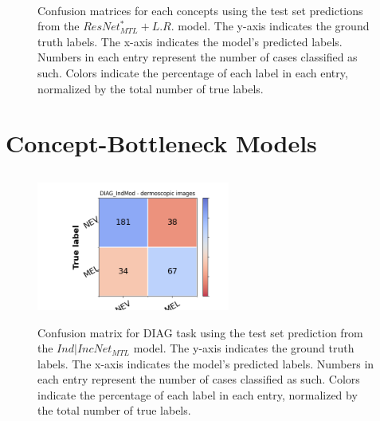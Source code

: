 \begin{figure}[ht]
\\
\caption{Confusion matrices for each concepts using the test set predictions
from the $ResNet^*_{MTL}+L.R.$ model. The y-axis indicates the ground truth labels. The x-axis indicates the model’s predicted labels. Numbers in each entry represent
the number of cases classified as such. Colors indicate the percentage of each
label in each entry, normalized by the total number of true labels.}
\label{CMincNetMTLLR}
\end{figure}

\clearpage
\section{Concept-Bottleneck Models}

\subsection{\texorpdfstring{}{TEXT}}
\begin{figure}[ht]
\centering
{\includegraphics[width =2.5in]{images/appendice/mtl/DIAG_CM_IndMod.png}}
\caption{Confusion matrix for DIAG task using the test set prediction
from the $Ind|IncNet_{MTL}$ model. The y-axis indicates the ground truth labels. The x-axis indicates the model’s predicted labels. Numbers in each entry represent
the number of cases classified as such. Colors indicate the percentage of each
label in each entry, normalized by the total number of true labels.}
\label{IndincNetCM}
\end{figure}

